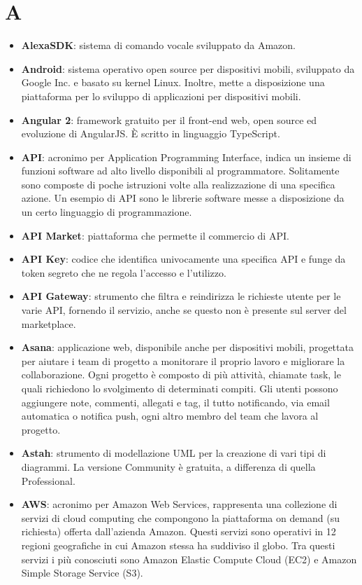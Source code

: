 \section{A}
\begin{itemize}
	\item \textbf{AlexaSDK}: sistema di comando vocale sviluppato da Amazon.
	\item \textbf{Android}: sistema operativo open source per dispositivi mobili, sviluppato da Google Inc. e basato su kernel Linux. Inoltre, mette a disposizione una piattaforma per lo sviluppo di applicazioni per dispositivi mobili.
	\item \textbf{Angular 2}: framework gratuito per il front-end web, open source ed evoluzione di AngularJS. \MakeUppercase{è} scritto in linguaggio TypeScript.
	\item \textbf{API}: acronimo per Application Programming Interface, indica un insieme di funzioni software ad alto livello disponibili al programmatore. Solitamente sono composte di poche istruzioni volte alla realizzazione di una specifica azione. Un esempio di API sono le librerie software messe a disposizione da un certo linguaggio di programmazione.
	\item \textbf{API Market}: piattaforma che permette il commercio di API.
	\item \textbf{API Key}: codice che identifica univocamente una specifica API e funge da token segreto che ne regola l'accesso e l'utilizzo.
	\item \textbf{API Gateway}: strumento che filtra e reindirizza le richieste utente per le varie API, fornendo il servizio, anche se questo non è presente sul server del marketplace. 
	\item \textbf{Asana}: applicazione web, disponibile anche per dispositivi mobili, progettata per aiutare i team di progetto a monitorare il proprio lavoro e migliorare la collaborazione. Ogni progetto è composto di più attività, chiamate task, le quali richiedono lo svolgimento di determinati compiti. Gli utenti possono aggiungere note, commenti, allegati e tag, il tutto notificando, via email automatica o notifica push, ogni altro membro del team che lavora al progetto.
	\item \textbf{Astah}: strumento di modellazione UML per la creazione di vari tipi di diagrammi. La versione Community è gratuita, a differenza di quella Professional.
	\item \textbf{AWS}: acronimo per Amazon Web Services, rappresenta una collezione di servizi di cloud computing che compongono la piattaforma on demand (su richiesta) offerta dall'azienda Amazon. Questi servizi sono operativi in 12 regioni geografiche in cui Amazon stessa ha suddiviso il globo. Tra questi servizi i più conosciuti sono Amazon Elastic Compute Cloud (EC2) e Amazon Simple Storage Service (S3).

\end{itemize}
